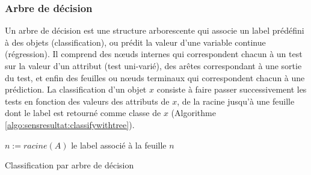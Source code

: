 \subsubsection{Arbre de décision}
Un arbre de décision est une structure arborescente qui associe un label prédéfini à des objets (classification), ou prédit la valeur d'une variable continue (régression). Il comprend des n\oe{}uds internes qui correspondent chacun à un test sur la valeur d'un attribut (test uni-varié), des arêtes correspondant à une sortie du test, et enfin des feuilles ou n\oe{}uds terminaux qui correspondent chacun à une prédiction. La classification d'un objet $x$ consiste à faire passer successivement les tests en fonction des valeurs des attributs de $x$, de la racine jusqu'à une feuille dont le label est retourné comme classe de $x$ (Algorithme \ref{algo:sensresultat:classifywithtree}).

\begin{algorithm}[ht] \small
	$n := racine(A)$ \; 
	\Return le label associé à la feuille $n$\;
	\caption{Classification par arbre de décision} \label{algo:sensresultat:classifywithtree}
\end{algorithm}

